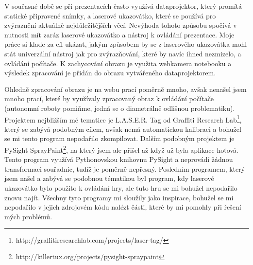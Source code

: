 \documentclass[twoside,12pt]{article}
\begin{document}
V současné době se při prezentacích často využívá dataprojektor, který promítá statické připravené snímky, a laserové ukazovátko, které se používá pro zvýraznění aktuálně nejdůležitějších věcí. Nevýhoda tohoto způsobu spočívá v nutnosti mít zaráz laserové ukazovátko a nástroj k ovládání prezentace. Moje práce si klade za cíl ukázat, jakým způsobem by se z laserového ukazovátka mohl stát univerzální nástroj jak pro zvýrazňování, které by navíc ihned nezmizelo, a ovládání počítače. K zachycování obrazu je využita webkamera notebooku a výsledek zpracování je přidán do obrazu vytvářeného dataprojektorem.


Ohledně zpracování obrazu je na webu prací poměrně mnoho, avšak nenašel jsem mnoho prací, které by využívaly zpracovaný obraz k ovládání počítače (autonomní roboty pomiňme, jedná se o diametrálně odlišnou problematiku). Projektem nejbližším mé tematice je L.A.S.E.R. Tag od Graffiti Research Lab\footnote{http://graffitiresearchlab.com/projects/laser-tag/}, který se zabývá podobným cílem, avšak nemá automatickou kalibraci a bohužel se mi tento program nepodařilo zkompilovat. Dalším podobným projektem je PySight SprayPaint\footnote{http://killertux.org/projects/pysight-spraypaint}, na který jsem ale přišel až když už byla aplikace hotová. Tento program využívá Pythonovskou knihovnu PySight a neprovádí žádnou transformaci souřadnic, tudíž je poměrně nepřesný. Posledním programem, který jsem našel a zabývá se podobnou tématikou byl program, kdy laserové ukazovátko bylo použito k ovládání hry, ale tuto hru se mi bohužel nepodařilo znovu najít. Všechny tyto programy mi sloužily jako inspirace, bohužel se mi nepodařilo v jejich zdrojovém kódu nalézt části, které by mi pomohly při řešení mých problémů. 
\end{document}
